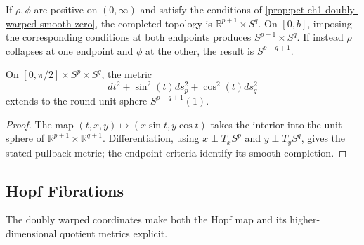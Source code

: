 \begin{remark}
  \label{rem:pet-ch1-doubly-warped-topologies}
  \leanok
  If $\rho,\phi$ are positive on $(0,\infty)$ and satisfy the conditions of
  \cref{prop:pet-ch1-doubly-warped-smooth-zero}, the completed topology is
  $\mathbb{R}^{p+1}\times S^q$. On $[0,b]$, imposing the corresponding
  conditions at both endpoints produces $S^{p+1}\times S^q$. If instead
  $\rho$ collapses at one endpoint and $\phi$ at the other, the result is
  $S^{p+q+1}$.
\end{remark}

\begin{example}
  \label{ex:pet-ch1-sphere-doubly-warped}
  \leanok
  On $[0,\pi/2]\times S^p\times S^q$, the metric
  \[
    dt^2+\sin^2(t)ds_p^2+\cos^2(t)ds_q^2
  \]
  extends to the round unit sphere $S^{p+q+1}(1)$.
\end{example}
\begin{proof}
  \leanok
  \sketch
  The map
  $(t,x,y)\mapsto(x\sin t,y\cos t)$ takes the interior into the unit sphere
  of $\mathbb{R}^{p+1}\times\mathbb{R}^{q+1}$. Differentiation, using
  $x\perp T_xS^p$ and $y\perp T_yS^q$, gives the stated pullback metric; the
  endpoint criteria identify its smooth completion.
\end{proof}

\subsection{Hopf Fibrations}

The doubly warped coordinates make both the Hopf map and its higher-dimensional
quotient metrics explicit.

